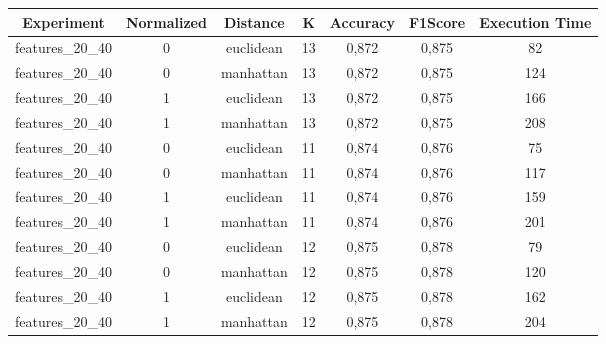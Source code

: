 \documentclass[12pt]{article}
\begin{document}
\begin{table}[!htb]
  \centering
  \begin{tabular}{|c|c|c|c|c|c|c|}
  \hline
  \textbf{Experiment} & \textbf{Normalized} & \textbf{Distance} & \textbf{K} & \textbf{Accuracy} & \textbf{F1Score} & \textbf{Execution Time} \\ \hline
  features\_20\_40    & 0                   & euclidean         & 13         & 0,872             & 0,875            & 82                      \\ \hline
  features\_20\_40    & 0                   & manhattan         & 13         & 0,872             & 0,875            & 124                     \\ \hline
  features\_20\_40    & 1                   & euclidean         & 13         & 0,872             & 0,875            & 166                     \\ \hline
  features\_20\_40    & 1                   & manhattan         & 13         & 0,872             & 0,875            & 208                     \\ \hline
  features\_20\_40    & 0                   & euclidean         & 11         & 0,874             & 0,876            & 75                      \\ \hline
  features\_20\_40    & 0                   & manhattan         & 11         & 0,874             & 0,876            & 117                     \\ \hline
  features\_20\_40    & 1                   & euclidean         & 11         & 0,874             & 0,876            & 159                     \\ \hline
  features\_20\_40    & 1                   & manhattan         & 11         & 0,874             & 0,876            & 201                     \\ \hline
  features\_20\_40    & 0                   & euclidean         & 12         & 0,875             & 0,878            & 79                      \\ \hline
  features\_20\_40    & 0                   & manhattan         & 12         & 0,875             & 0,878            & 120                     \\ \hline
  features\_20\_40    & 1                   & euclidean         & 12         & 0,875             & 0,878            & 162                     \\ \hline
  features\_20\_40    & 1                   & manhattan         & 12         & 0,875             & 0,878            & 204                     \\ \hline

\end{tabular}
\end{table}
\end{document}
